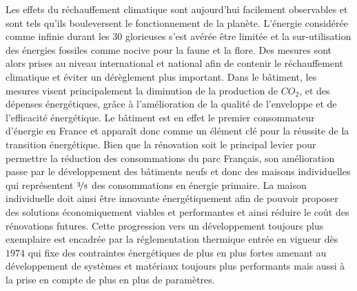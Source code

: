 
Les effets du réchauffement climatique sont aujourd’hui facilement observables et sont
tels qu’ils bouleversent le fonctionnement de la planète. L’énergie considérée comme
infinie durant les \num{30} glorieuses s’est avérée être limitée et la sur-utilisation des
énergies fossiles comme nocive pour la faune et la flore. Des mesures sont alors prises au
niveau international et national afin de contenir le réchauffement climatique et éviter un
dérèglement plus important. Dans le bâtiment, les mesures visent principalement la
diminution de la production de $CO_{2}$, et des dépenses énergétiques, grâce à
l’amélioration de la qualité de l’enveloppe et de l’efficacité énergétique. Le bâtiment
est en effet le premier consommateur d’énergie en France et apparaît donc comme un élément
clé pour la réussite de la transition énergétique. Bien que la rénovation soit le
principal levier pour permettre la réduction des consommations du parc Français, son
amélioration passe par le développement des bâtiments neufs et donc des maisons
individuelles qui représentent $\nicefrac{3}{8}$ des consommations en énergie primaire. La
maison individuelle doit ainsi être innovante énergétiquement afin de pouvoir proposer des
solutions économiquement viables et performantes et ainsi réduire le coût des rénovations
futures. Cette progression vers un développement toujours plus exemplaire est encadrée par
la réglementation thermique entrée en vigueur dès $1974$ qui fixe des contraintes
énergétiques de plus en plus fortes amenant au développement de systèmes et matériaux
toujours plus performants mais aussi à la prise en compte de plus en plus de paramètres.

